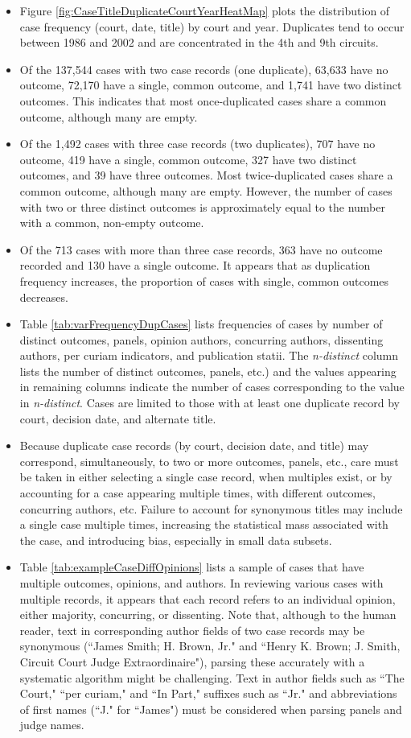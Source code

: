 \documentclass[10pt, letterpaper]{article}
\begin{document}
\begin{spacing}{1.0}
\begin{itemize}
    \item Figure \ref{fig:CaseTitleDuplicateCourtYearHeatMap} plots the distribution of case frequency (court, date, title) by court and year.  Duplicates tend to occur between 1986 and 2002 and are concentrated in the 4th and 9th circuits.
    \item Of the 137,544 cases with two case records (one duplicate), 63,633 have no outcome, 72,170 have a single, common outcome, and 1,741 have two distinct outcomes.  This indicates that most once-duplicated cases share a common outcome, although many are empty.
    \item Of the 1,492 cases with three case records (two duplicates), 707 have no outcome, 419 have a single, common outcome, 327 have two distinct outcomes, and 39 have three outcomes.  Most twice-duplicated cases share a common outcome, although many are empty.  However, the number of cases with two or three distinct outcomes is approximately equal to the number with a common, non-empty outcome.
    \item Of the 713 cases with more than three case records, 363 have no outcome recorded and 130 have a single outcome.  It appears that as duplication frequency increases, the proportion of cases with single, common outcomes decreases.
    \item Table \ref{tab:varFrequencyDupCases} lists frequencies of cases by number of distinct outcomes, panels, opinion authors, concurring authors, dissenting authors, per curiam indicators, and publication statii.  The \textit{n-distinct} column lists the number of distinct outcomes, panels, etc.) and the values appearing in remaining columns indicate the number of cases corresponding to the value in \textit{n-distinct}.  Cases are limited to those with at least one duplicate record by court, decision date, and alternate title.
    \item Because duplicate case records (by court, decision date, and title) may correspond, simultaneously, to two or more outcomes, panels, etc., care must be taken in either selecting a single case record, when multiples exist, or by accounting for a case appearing multiple times, with different outcomes, concurring authors, etc.  Failure to account for synonymous titles may include a single case multiple times, increasing the statistical mass associated with the case, and introducing bias, especially in small data subsets.
    \item Table \ref{tab:exampleCaseDiffOpinions} lists a sample of cases that have multiple outcomes, opinions, and authors.  In reviewing various cases with multiple records, it appears that each record refers to an individual opinion, either majority, concurring, or dissenting.  Note that, although to the human reader, text in corresponding author fields of two case records may be synonymous (``James Smith; H. Brown, Jr." and  ``Henry K. Brown; J. Smith, Circuit Court Judge Extraordinaire"), parsing these accurately with a systematic algorithm might be challenging.  Text in author fields such as ``The Court," ``per curiam," and ``In Part," suffixes such as ``Jr." and abbreviations of first names (``J." for ``James") must be considered when parsing panels and judge names. 

\end{itemize}
\end{spacing}
\end{document}
